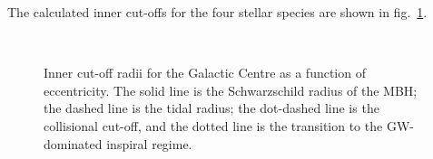 \documentclass[useAMS,usedcolumn,usegraphicx,usenatbib]{mn2e}
\newcommand{\figref}[1]{fig.~\ref{fig:#1}}
\begin{document}
The calculated inner cut-offs for the four stellar species are shown in \figref{Cuts}.
\begin{figure}
\begin{center}
    \quad 
    \\
    \quad
\caption{Inner cut-off radii for the Galactic Centre as a function of eccentricity. The solid line is the Schwarzschild radius of the MBH; the dashed line is the tidal radius; the dot-dashed line is the collisional cut-off, and the dotted line is the transition to the GW-dominated inspiral regime.\label{fig:Cuts}}
  \end{center}
\end{figure}
\end{document}
